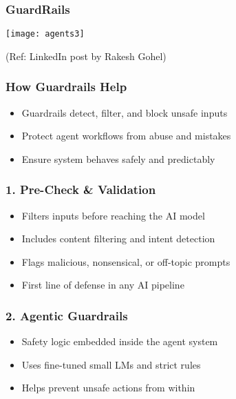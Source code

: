 \begin{frame}[fragile]\frametitle{GuardRails}
	
	\begin{center}
	\texttt{[image: agents3]}
	\end{center}
	
{\tiny (Ref: LinkedIn post by Rakesh Gohel)}

\end{frame}


\begin{frame}[fragile]\frametitle{How Guardrails Help}
    \begin{itemize}
        \item Guardrails detect, filter, and block unsafe inputs
        \item Protect agent workflows from abuse and mistakes
        \item Ensure system behaves safely and predictably
    \end{itemize}
\end{frame}

\begin{frame}[fragile]\frametitle{1. Pre-Check \& Validation}
    \begin{itemize}
        \item Filters inputs before reaching the AI model
        \item Includes content filtering and intent detection
        \item Flags malicious, nonsensical, or off-topic prompts
        \item First line of defense in any AI pipeline
    \end{itemize}
\end{frame}

\begin{frame}[fragile]\frametitle{2. Agentic Guardrails}
    \begin{itemize}
        \item Safety logic embedded inside the agent system
        \item Uses fine-tuned small LMs and strict rules
        \item Helps prevent unsafe actions from within
    \end{itemize}
\end{frame}

